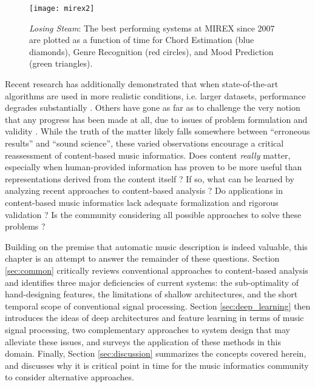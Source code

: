 \begin{figure}
\begin{centering}
\texttt{[image: mirex2]}
\caption{\emph{Losing Steam}: The best performing systems at MIREX since 2007 are plotted as a function of time for Chord Estimation (blue diamonds), Genre Recognition (red circles), and Mood Prediction (green triangles).}
\label{fig:mirex}
\end{centering}
\end{figure}

Recent research has additionally demonstrated that when state-of-the-art algorithms are used in more realistic conditions, i.e. larger datasets, performance degrades substantially \cite{BertinMahieux2012Largescale}.
Others have gone as far as to challenge the very notion that any progress has been made at all, due to issues of problem formulation and validity \cite{Sturm2014State}.
While the truth of the matter likely falls somewhere between ``erroneous results'' and ``sound science'', these varied observations encourage a critical reassessment of content-based music informatics.
Does content \emph{really} matter, especially when human-provided information has proven to be more useful than representations derived from the content itself \cite{Slaney2011Webscale}?
If so, what can be learned by analyzing recent approaches to content-based analysis \cite{Flexer2012MIREX}?
Do applications in content-based music informatics lack adequate formalization and rigorous validation \cite{Sturm2014Kiki}?
Is the community considering all possible approaches to solve these problems \cite{Humphrey2012Moving}?

Building on the premise that automatic music description is indeed valuable, this chapter is an attempt to answer the remainder of these questions.
Section \ref{sec:common} critically reviews conventional approaches to content-based analysis and identifies three major deficiencies of current systems: the sub-optimality of hand-designing features, the limitations of shallow architectures, and the short temporal scope of conventional signal processing.
Section \ref{sec:deep_learning} then introduces the ideas of deep architectures and feature learning in terms of music signal processing, two complementary approaches to system design that may alleviate these issues, and surveys the application of these methods in this domain.
Finally, Section \ref{sec:discussion} summarizes the concepts covered herein, and discusses why it is critical point in time for the music informatics community to consider alternative approaches.


